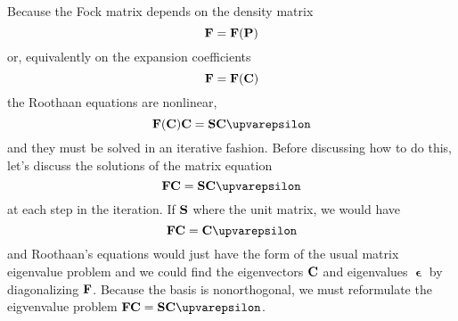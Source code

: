 \documentclass[11pt]{article}
\begin{document}
Because the Fock matrix depends on the density matrix 
\begin{equation}\label{key}
\textbf{F} = \textbf{F}(\textbf{P})
\end{equation}
or, equivalently on the expansion coefficients 
\begin{equation}\label{key}
\textbf{F} = \textbf{F}(\textbf{C})
\end{equation}
the Roothaan equations are nonlinear, 
\begin{equation}\label{key}
\bb{F}(\bb{C})\bb{C} = \bb{S}\bb{C}\bm{\upvarepsilon}
\end{equation}
and they must be solved in an iterative fashion. Before discussing how to do this, let's discuss the solutions of the matrix equation 
\begin{equation}\label{key}
\bb{FC} = \bb{SC} \bm{\upvarepsilon}
\end{equation}
at each step in the iteration. If $\textbf{S}$ where the unit matrix, we would have 
\begin{equation}\label{key}
\bb{FC} = \bb{C} \bm{\upvarepsilon}
\end{equation}
and Roothaan's equations would just have the form of the usual matrix eigenvalue problem and we could find the eigenvectors $\textbf{C}$ and eigenvalues $\bm{\upvarepsilon}$ by diagonalizing $\textbf{F}$. Because the basis is nonorthogonal, we must reformulate the eigvenvalue problem $\bb{FC} = \bb{SC}\bm{\upvarepsilon}$.
 
\end{document}
